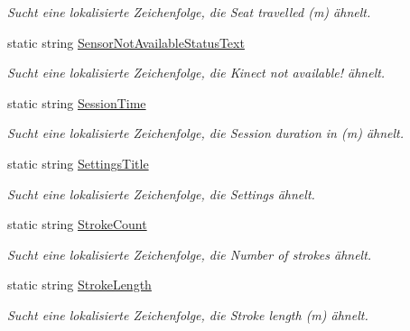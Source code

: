 \begin{DoxyCompactItemize}
\begin{DoxyCompactList}\small\item\em Sucht eine lokalisierte Zeichenfolge, die Seat travelled (m) ähnelt. \end{DoxyCompactList}\item 
static string \hyperlink{class_rowing_monitor_1_1_properties_1_1_resources_a9966b553e0fb646c78b9256ef6574b53}{Sensor\+Not\+Available\+Status\+Text}
\begin{DoxyCompactList}\small\item\em Sucht eine lokalisierte Zeichenfolge, die Kinect not available! ähnelt. \end{DoxyCompactList}\item 
static string \hyperlink{class_rowing_monitor_1_1_properties_1_1_resources_a0224e4993f61a965fcf0daadb31bfc97}{Session\+Time}
\begin{DoxyCompactList}\small\item\em Sucht eine lokalisierte Zeichenfolge, die Session duration in (m) ähnelt. \end{DoxyCompactList}\item 
static string \hyperlink{class_rowing_monitor_1_1_properties_1_1_resources_a655e6b7c1b7acdb6fadf85cd16f3a419}{Settings\+Title}
\begin{DoxyCompactList}\small\item\em Sucht eine lokalisierte Zeichenfolge, die Settings ähnelt. \end{DoxyCompactList}\item 
static string \hyperlink{class_rowing_monitor_1_1_properties_1_1_resources_a09527fe0922f1b0c8ebfa2cb18864020}{Stroke\+Count}
\begin{DoxyCompactList}\small\item\em Sucht eine lokalisierte Zeichenfolge, die Number of strokes ähnelt. \end{DoxyCompactList}\item 
static string \hyperlink{class_rowing_monitor_1_1_properties_1_1_resources_a4d981dd414bccd9c3ce89a0e4b039fb2}{Stroke\+Length}
\begin{DoxyCompactList}\small\item\em Sucht eine lokalisierte Zeichenfolge, die Stroke length (m) ähnelt. \end{DoxyCompactList}\item 

\end{DoxyCompactItemize}
